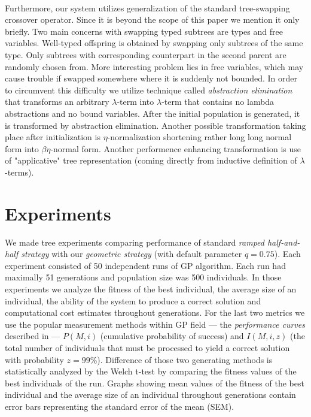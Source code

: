 \documentclass[conference]{IEEEtran}
\newcommand{\lterm}{$\lambda$-term\xspace}
\newcommand{\lterms}{$\lambda$-terms\xspace}
\begin{document}
~\\
Furthermore, our system utilizes generalization of the standard 
tree-swapping crossover operator. Since it is beyond the scope of this 
paper we mention it only briefly. Two main concerns with swapping typed subtrees 
are types and free variables. Well-typed offspring is obtained 
by swapping only subtrees of the same type. Only subtrees with 
corresponding counterpart in the second parent are randomly chosen from.
More interesting problem lies in free variables, which may cause trouble
if swapped somewhere where it is suddenly not bounded. In order to circumvent this
difficulty we utilize technique called \textit{abstraction elimination}\cite{jones87}
that transforms an arbitrary \lterm into \lterm that contains no lambda abstractions
and no bound variables. After the initial population is generated,  it is transformed
by abstraction elimination. Another possible transformation taking place
after initialization is $\eta$-normalization shortening 
rather long long normal form into $\beta\eta$-normal form.  
Another performence enhancing transformation is use of "applicative" tree 
representation (coming directly from inductive definition of \lterms). 



\section{Experiments}
\label{experiments}

We made tree experiments comparing performance of standard 
\textit{ramped half-and-half strategy} with our
\textit{geometric strategy} (with default parameter $q=0.75$). 
Each experiment consisted of 50 independent runs 
of GP algorithm. Each run had maximally 51 generations and population size
was 500 individuals.
In those experiments we analyze the fitness of the best individual,
the average size of an individual,
the ability of the system to produce a correct solution 
and computational cost estimates throughout generations. 
For the last two metrics we use the popular measurement  
methods within GP field --- the \textit{performance curves}
described in \cite{koza92} --- $P(M,i)$ (cumulative probability of success) 
and $I(M,i,z)$ (the total number of individuals that must be processed 
to yield a correct solution with probability $z =99\%$).
Difference of those two generating methods 
is statistically analyzed by the Welch t-test
by comparing the fitness values of the best individuals of the run. 
Graphs showing mean values of the fitness of the best individual and
the average size of an individual throughout generations
contain error bars representing the standard error of the mean (SEM).
\end{document}
